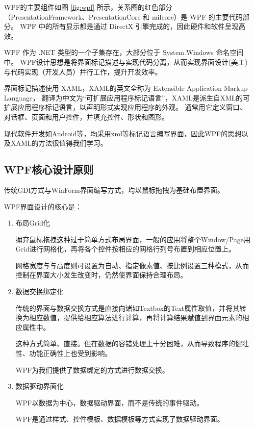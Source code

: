  WPF的主要组件如图 \ref{fig:wpf} 所示，关系图的红色部分（PresentationFramework、PresentationCore 和 milcore）是 WPF 的主要代码部分。 WPF 中的所有显示都是通过 DirectX 引擎完成的，因此硬件和软件呈现高效。
 
 WPF 作为 .NET 类型的一个子集存在，大部分位于 System.Windows 命名空间中。 
 WPF设计思想是将界面标记描述与实现代码分离，从而实现界面设计(美工)与代码实现（开发人员）并行工作，提升开发效率。
 
界面标记描述使用 XAML，XAML的英文全称为 Extensible Application Markup Language， 翻译为中文为``可扩展应用程序标记语言''，XAML是派生自XML的可扩展应用程序标记语言，以声明形式实现应用程序的外观。 通常用它定义窗口、对话框、页面和用户控件，并填充控件、形状和图形。
  
现代软件开发如Android等，均采用xml等标记语言编写界面，因此WPF的思想以及XAML的方法很值得我们学习。
 
\subsection{WPF核心设计原则}

传统GDI方式与WinForm界面编写方式，均以鼠标拖拽为基础布置界面。

WPF界面设计的核心是：

\begin{enumerate}
    
\item 布局Grid化

摒弃鼠标拖拽这种过于简单方式布局界面，一般的应用将整个Window/Page用Grid进行网格化，再将各个控件按相应的网格行列号布置到相应位置上。

网格宽度与与高度则可设置为自动、指定像素值、按比例设置三种模式，从而控制在界面大小发生改变时，仍然使界面保持合理布局。

\item 数据交换绑定化

传统的界面与数据交换方式是直接向诸如Textbox的Text属性取值，并将其转换为相应数值，提供给相应算法进行计算，再将计算结果赋值到界面元素的相应属性中。

这种方式简单、直接。但在数据的容错处理上十分困难，从而导致程序的健壮性、功能正确性上也受到影响。

WPF为我们提供了数据绑定的方式进行数据交换。

\item 数据驱动界面化

WPF以数据为中心，数据驱动界面，而不是传统的事件驱动。

WPF是通过样式、控件模板、数据模板等方式实现了数据驱动界面。


\end{enumerate}



